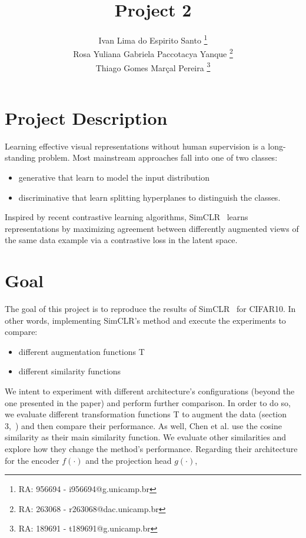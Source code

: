 \documentclass[]{IEEEtran}
\begin{document}
\title{Project 2 }
\author{Ivan Lima do Espirito Santo \thanks{RA: 956694 - i956694@g.unicamp.br}\\ Rosa Yuliana Gabriela Paccotacya Yanque \thanks{RA: 263068 - r263068@dac.unicamp.br} \\ Thiago Gomes Marçal Pereira \thanks{RA: 189691 - t189691@g.unicamp.br}}

\maketitle

\section{Project Description}
Learning effective visual representations without human supervision is a long-standing problem. Most mainstream approaches fall into one of two classes: 
\begin{itemize}
    \item generative that learn to model the input distribution
    \item discriminative that learn splitting hyperplanes to distinguish the classes. 
\end{itemize}
Inspired by recent contrastive learning algorithms, SimCLR~\cite{chen2020simple} learns representations by maximizing agreement between differently augmented views of the same data example via a contrastive loss in the latent space. 

\section{Goal}\label{simCLR}
The goal of this project is to reproduce the results of SimCLR~\cite{chen2020simple} for CIFAR10. In other words, implementing SimCLR's method and execute the experiments to compare: 
\begin{itemize}
    \item different augmentation functions T
    \item different similarity functions
\end{itemize}
We intent to experiment with different architecture's configurations (beyond the one presented in the paper) and perform further comparison. 
In order to do so, we evaluate different transformation functions T to augment the data (section 3,~\cite{chen2020simple}) and then compare their performance. As well, Chen et al. use the cosine similarity as their main similarity function. We  evaluate other similarities and explore how they change the method’s performance. 
Regarding their architecture for the encoder \(f(·)\)  and the projection head \(g(·)\), 
\end{document}
